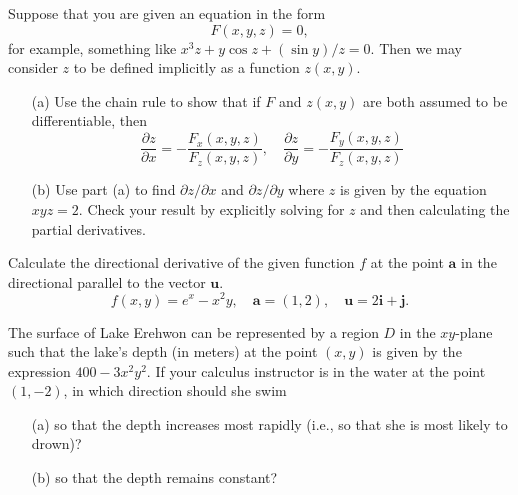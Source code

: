 \documentclass[11pt,letterpaper,boxed]{hmcpset}
\newcommand{\pdr}[2]{\frac{\partial #1}{\partial #2}}
\begin{document}
\begin{problem}[Colley 2.5 \#36]
Suppose that you are given an equation in the form
\[
	F(x,y,z) = 0,
\]
for example, something like $x^3z+y\cos z+ (\sin y)/z=0$. Then we
may consider $z$ to be defined implicitly as a function $z(x,y)$.
\begin{enumerate}
\item[(a)] Use the chain rule to show that if $F$ and $z(x,y)$ are both assumed to be differentiable, then
\[
	\pdr{z}{x} = - \frac{F_x(x,y,z)}{F_z(x,y,z)}, \quad \pdr{z}{y} = -\frac{F_y(x,y,z)}{F_z(x,y,z)}
\]
\item[(b)] Use part (a) to find $\partial z / \partial x$ and $\partial z / \partial y$ where $z$ is given
by the equation $xyz=2$. Check your result by explicitly solving for $z$ and then calculating the partial derivatives.
\end{enumerate}
\end{problem}

\begin{solution}
\vfill
\end{solution}
\newpage

\begin{problem}[Colley 2.6 \#5]
Calculate the directional derivative of the given function $f$ at the point $\mathbf{a}$ in the directional parallel to the
vector $\mathbf{u}$.
\[
	f(x,y) = e^x - x^2y, \quad \mathbf{a} = (1,2), \quad \mathbf{u} = 2\mathbf{i}+\mathbf{j}.
\]
\end{problem}

\begin{solution}
\vfill
\end{solution}
\newpage

\begin{problem}[Colley 2.6 \#11]
The surface of Lake Erehwon can be represented by a region $D$ in the $xy$-plane such that the lake's depth (in meters) at the point $(x,y)$ is given
by the expression $400-3x^2y^2$. If your calculus instructor is in the water at the point $(1,-2)$, in which direction should she swim
\begin{enumerate}
\item[(a)] so that the depth increases most rapidly (i.e., so that she is most likely to drown)?
\item[(b)] so that the depth remains constant?
\end{enumerate}
\end{problem}

\begin{solution}
\vfill
\end{solution}
\newpage
\end{document}
